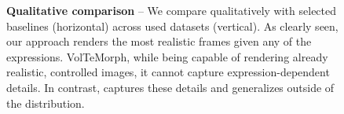 {
}
\begin{figure}[t]
  \centering
  \resizebox{\linewidth}{!}{
    \versionthree
  }
  \caption[Qualitative comparison between \blendfields and chosen baselines]{\textbf{Qualitative comparison} --
    We compare qualitatively \blendfields with selected baselines
    (horizontal) across used datasets (vertical).
    As clearly seen, our approach renders the most realistic frames given any of
    the expressions.
    VolTeMorph, while being capable of rendering already realistic, controlled
    images, it cannot capture expression-dependent details.
    In contrast, \blendfields captures these details and generalizes outside of
    the distribution.
  }
  \label{fig:blendfields-qualitative-comparison}
\end{figure}